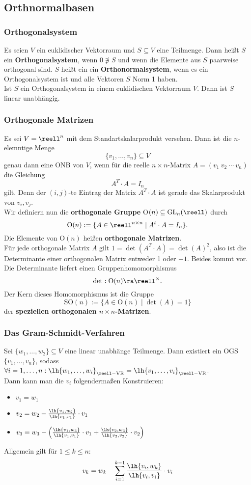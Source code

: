 \documentclass{kit}
\begin{document}
  \subsection{Orthnormalbasen}
    \subsubsection{Orthogonalsystem}
      Es seien $V$ ein euklidischer Vektorraum und $S\subseteq V$ eine Teilmenge. Dann heißt $S$ ein 
      \textbf{Orthogonalsystem}, wenn $0\not\ni S$ und wenn die Elemente aus $S$ paarweise orthogonal sind. $S$ heißt ein
      ein \textbf{Orthonormalsystem}, wenn es ein Orthogonalsystem ist und alle Vektoren $S$ Norm 1 haben.\\
      Ist $S$ ein Orthogonalsystem in einem euklidischen Vektorraum $V$. Dann ist $S$ linear unabhängig.
    \subsubsection{Orthogonale Matrizen}
      Es sei $V=\reell^n$ mit dem Standartskalarprodukt versehen. Dann ist die $n$-elemntige Menge
      $$\{v_1,\dots,v_n\}\subseteq V$$
      genau dann eine ONB von $V$, wenn für die reelle $n\times n$-Matrix $A=(v_1\ v_2\ \cdots\ v_n)$ die Gleichung
      $$A^T\cdot A=I_n$$
      gilt. Denn der $(i,j)$-te Eintrag der Matrix $A^T\cdot A$ ist gerade das Skalarprodukt von $v_i,v_j$.\\
      Wir definiern nun die \textbf{orthogonale Gruppe} O$(n)\subseteq \text{GL}_n(\reell)$ durch
      $$\text{O}(n):=\{A\in\reell^{n\times n}\mid A^t\cdot A=I_n\}.$$
      Die Elemente von O$(n)$ heißen \textbf{orthogonale Matrizen}.\\
      Für jede orthogonale Matrix $A$ gilt $1=\det(A^T\cdot A)=\det(A)^2$, also ist die Determinante einer orthogonalen
      Matrix entweder 1 oder $-1$. Beides kommt vor. Die Determinante liefert einen Gruppenhomomorphismus
      $$\det:\text{O}(n)\ra\reell^\times.$$
      Der Kern dieses Homomorphismus ist die Gruppe
      $$\text{SO}(n):=\{A\in\text{O}(n)\mid\det(A)=1\}$$
      der \textbf{speziellen orthogonalen $n\times n$-Matrizen}.
    \subsubsection{Das Gram-Schmidt-Verfahren}
      Sei $\{w_1,\dots,w_2\}\subseteq V$ eine linear unabhänge Teilmenge. Dann existiert ein OGS $\{v_1,\dots,v_n\}$,
      sodass $\forall i=1,\dots,n:\lh{w_1,\dots,w_i}_{\reell-\text{VR}}=\lh{v_1,\dots,v_i}_{\reell-\text{VR}}$.\\
      Dann kann man die $v_i$ folgendermaßen Konstruieren:
      \begin{itemize}
        \item $v_1=w_1$
        \item $v_2=w_2-\frac{\lh{v_1,w_2}}{\lh{v_1,v_1}}\cdot v_1$
        \item $v_3=w_3-\left(\frac{\lh{v_1,w_3}}{\lh{v_1,v_1}}\cdot v_1+\frac{\lh{v_2,w_3}}{\lh{v_2,v_2}}\cdot v_2\right)$
      \end{itemize}
      Allgemein gilt für $1\le k\le n$:
      $$v_k=w_k-\sum_{i=1}^{k-1}\frac{\lh{v_i,w_k}}{\lh{v_i,v_i}}\cdot v_i$$
\end{document}
